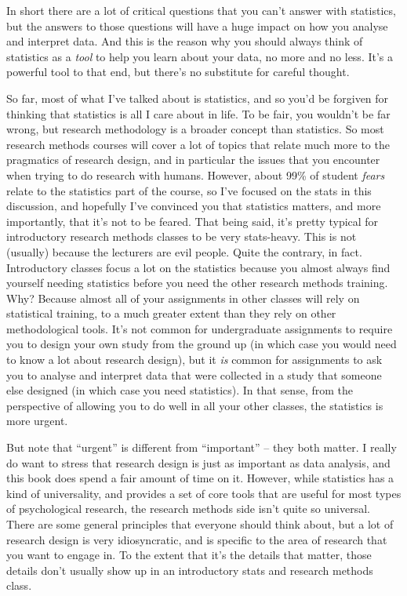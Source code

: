\documentclass[]{book}
\begin{document}
In short there are a lot of critical questions that you can't answer with statistics, but the answers to those questions will have a huge impact on how you analyse and interpret data. And this is the reason why you should always think of statistics as a \emph{tool} to help you learn about your data, no more and no less. It's a powerful tool to that end, but there's no substitute for careful thought.

So far, most of what I've talked about is statistics, and so you'd be forgiven for thinking that statistics is all I care about in life. To be fair, you wouldn't be far wrong, but research methodology is a broader concept than statistics. So most research methods courses will cover a lot of topics that relate much more to the pragmatics of research design, and in particular the issues that you encounter when trying to do research with humans. However, about 99\% of student \emph{fears} relate to the statistics part of the course, so I've focused on the stats in this discussion, and hopefully I've convinced you that statistics matters, and more importantly, that it's not to be feared. That being said, it's pretty typical for introductory research methods classes to be very stats-heavy. This is not (usually) because the lecturers are evil people. Quite the contrary, in fact. Introductory classes focus a lot on the statistics because you almost always find yourself needing statistics before you need the other research methods training. Why? Because almost all of your assignments in other classes will rely on statistical training, to a much greater extent than they rely on other methodological tools. It's not common for undergraduate assignments to require you to design your own study from the ground up (in which case you would need to know a lot about research design), but it \emph{is} common for assignments to ask you to analyse and interpret data that were collected in a study that someone else designed (in which case you need statistics). In that sense, from the perspective of allowing you to do well in all your other classes, the statistics is more urgent.

But note that ``urgent'' is different from ``important'' -- they both matter. I really do want to stress that research design is just as important as data analysis, and this book does spend a fair amount of time on it. However, while statistics has a kind of universality, and provides a set of core tools that are useful for most types of psychological research, the research methods side isn't quite so universal. There are some general principles that everyone should think about, but a lot of research design is very idiosyncratic, and is specific to the area of research that you want to engage in. To the extent that it's the details that matter, those details don't usually show up in an introductory stats and research methods class.
\end{document}
